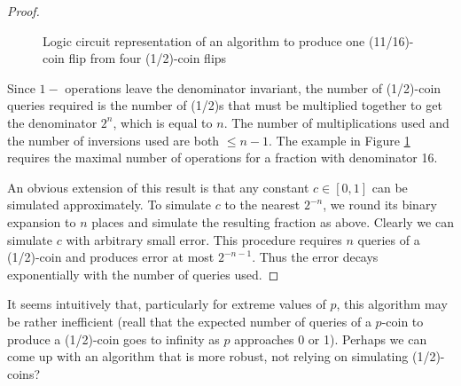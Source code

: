 \documentclass{article}
\theoremstyle{definition}
\begin{document}
\begin{proof}
\begin{figure}
\caption{Logic circuit representation of an algorithm to produce one (11/16)-coin flip from four (1/2)-coin flips}\label{fig:const_circuit}
\end{figure}

Since $1-$ operations leave the denominator invariant, the number of (1/2)-coin queries required is the number of (1/2)s that must be multiplied together to get the denominator $2^n$, which is equal to $n$.
The number of multiplications used and the number of inversions used are both $\leq n-1$. The example in Figure \ref{fig:const_circuit} requires the maximal number of operations for a fraction with denominator 16.

An obvious extension of this result is that any constant $c \in [0,1]$ can be simulated approximately. To simulate $c$ to the nearest $2^{-n}$, we round its binary expansion to $n$ places and simulate the resulting fraction as above. Clearly we can simulate $c$ with arbitrary small error. This procedure requires $n$ queries of a (1/2)-coin and produces error at most $2^{-n-1}$. Thus the error decays exponentially with the number of queries used.
\end{proof}

It seems intuitively that, particularly for extreme values of $p$, this algorithm may be rather inefficient (reall that the expected number of queries of a $p$-coin to produce a (1/2)-coin goes to infinity as $p$ approaches 0 or 1). Perhaps we can come up with an algorithm that is more robust, not relying on simulating (1/2)-coins?



\end{document}
